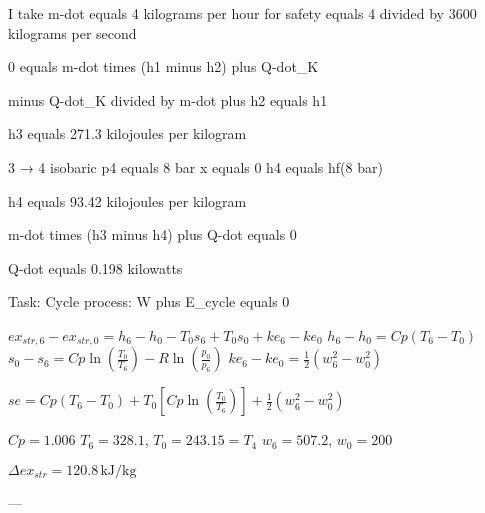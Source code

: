 I take m-dot equals 4 kilograms per hour for safety equals 4 divided by 3600 kilograms per second  

0 equals m-dot times (h1 minus h2) plus Q-dot_K  

minus Q-dot_K divided by m-dot plus h2 equals h1  

h3 equals 271.3 kilojoules per kilogram  

3 → 4 isobaric  
p4 equals 8 bar  
x equals 0  
h4 equals hf(8 bar)  

h4 equals 93.42 kilojoules per kilogram  

m-dot times (h3 minus h4) plus Q-dot equals 0  

Q-dot equals 0.198 kilowatts  

Task: Cycle process:  
W plus E_cycle equals 0

\( ex_{str,6} - ex_{str,0} = h_6 - h_0 - T_0 s_6 + T_0 s_0 + ke_6 - ke_0 \)  
\( h_6 - h_0 = Cp(T_6 - T_0) \)  
\( s_0 - s_6 = Cp \ln \left( \frac{T_0}{T_6} \right) - R \ln \left( \frac{p_0}{p_6} \right) \)  
\( ke_6 - ke_0 = \frac{1}{2} (w_6^2 - w_0^2) \)  

\( se = Cp(T_6 - T_0) + T_0 \left[ Cp \ln \left( \frac{T_0}{T_6} \right) \right] + \frac{1}{2} (w_6^2 - w_0^2) \)  

\( Cp = 1.006 \)  
\( T_6 = 328.1 \), \( T_0 = 243.15 = T_4 \)  
\( w_6 = 507.2 \), \( w_0 = 200 \)  

\( \Delta ex_{str} = 120.8 \, \text{kJ/kg} \)  

---